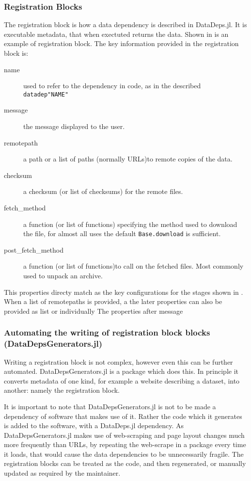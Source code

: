 \documentclass{jors}
\newcommand{\datadep}[1]{\texttt{datadep"{}#1"{}}}
\begin{document}
\subsubsection{Registration Blocks}
The registration block is how a data dependency is described in DataDeps.jl.
It is executable metadata, that when exectuted returns the data.
Shown in  is an example of registration block.
The key information provided in the registration block is:
\begin{description}
\item[name] used to refer to the dependency in code, as in the described \datadep{NAME}
\item[message] the message displayed to the user.
\item[remotepath] a path or a list of paths (normally URLs)to remote copies of the data.
\item[checksum] a checksum (or list of checksums) for the remote files.
\item[fetch_method]  a function  (or list of functions) specifying the method used to download the file, for almost all uses the default \texttt{Base.download} is sufficient.
\item[post_fetch_method] a function  (or list of functions)to call on the fetched files. Most commonly used to unpack an archive.
\end{description}
This properties directy match as the key configurations for the stages shown in .
When a list of remotepaths is provided,
a the later properties can also be provided as list or individually
The properties after message 




\subsubsection{Automating the writing of registration block blocks (DataDepsGenerators.jl)}
Writing a registration block is not complex, however even this can be further automated.
DataDepsGenerators.jl is a package which does this.
In principle it converts metadata of one kind, for example a website describing a dataset,
into another: namely the registration block.




It is important to note that DataDepsGenerators.jl is not to be made a dependency of software that makes use of it.
Rather the code which it generates is added to the software, with a DataDeps.jl dependency.
As DataDepsGenerators.jl makes use of web-scraping and page layout changes much more frequently than URLs,
by repeating the web-scrape in a package every time it loads, that would cause the data dependencies to be unnecessarily fragile.
The registration blocks can be treated as the code, and then regenerated, or manually updated as required by the maintainer.
\end{document}
